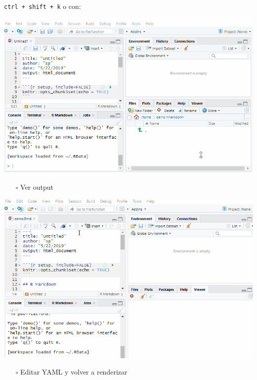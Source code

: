 \documentclass[
  letterpaper,
  DIV=11,
  numbers=noendperiod]{scrartcl}
\providecommand{\tightlist}{%
  \setlength{\itemsep}{0pt}\setlength{\parskip}{0pt}}\usepackage{longtable,booktabs,array}
\begin{document}
\texttt{ctrl\ +\ shift\ +\ k} o con:

\includegraphics{./figuras/knitting.gif}

\begin{itemize}
\tightlist
\item[$\square$]
  Ver output
\end{itemize}

\includegraphics{./figuras/preview.gif}

\begin{itemize}
\tightlist
\item[$\square$]
  Editar YAML y volver a renderizar
\end{itemize}
\end{document}
